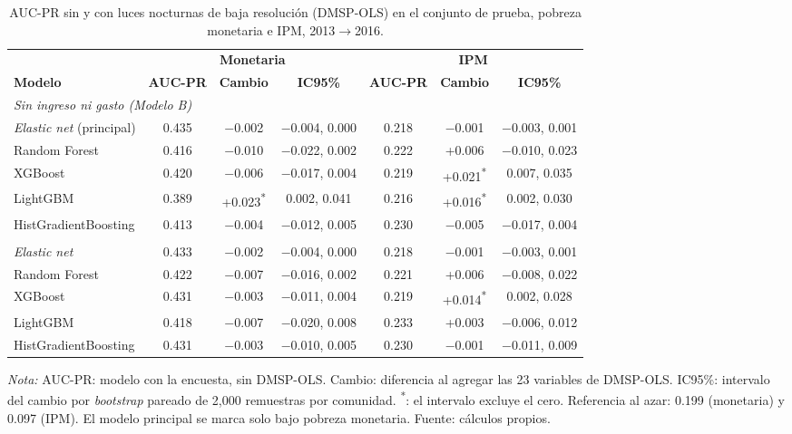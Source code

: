 \begin{table}[tbp]
  \centering
  \caption{AUC-PR sin y con luces nocturnas de baja resolución (DMSP-OLS) en el conjunto de prueba,
  pobreza monetaria e IPM, 2013$\to$2016.}
  \label{tab:aporte_dmsp_pr}
  \footnotesize
  \setlength{\tabcolsep}{4pt}
  \begin{tabular}{l ccc ccc}
    \toprule
    & \multicolumn{3}{c}{\textbf{Monetaria}} & \multicolumn{3}{c}{\textbf{IPM}} \\
    \cmidrule(lr){2-4}\cmidrule(lr){5-7}
    \textbf{Modelo} & \textbf{AUC-PR} & \textbf{Cambio} & \textbf{IC95\%} & \textbf{AUC-PR} & \textbf{Cambio} & \textbf{IC95\%} \\
    \midrule
    \multicolumn{7}{l}{\textit{Sin ingreso ni gasto (Modelo B)}} \\
    \quad \emph{Elastic net} (principal) & 0.435 & $-$0.002 & $-$0.004, 0.000 & 0.218 & $-$0.001 & $-$0.003, 0.001 \\
    \quad Random Forest & 0.416 & $-$0.010 & $-$0.022, 0.002 & 0.222 & +0.006 & $-$0.010, 0.023 \\
    \quad XGBoost & 0.420 & $-$0.006 & $-$0.017, 0.004 & 0.219 & +0.021\textsuperscript{*} & 0.007, 0.035 \\
    \quad LightGBM & 0.389 & +0.023\textsuperscript{*} & 0.002, 0.041 & 0.216 & +0.016\textsuperscript{*} & 0.002, 0.030 \\
    \quad HistGradientBoosting & 0.413 & $-$0.004 & $-$0.012, 0.005 & 0.230 & $-$0.005 & $-$0.017, 0.004 \\
    \addlinespace
    \multicolumn{7}{l}{\textit{Con ingreso y gasto (Modelo A)}} \\
    \quad \emph{Elastic net} & 0.433 & $-$0.002 & $-$0.004, 0.000 & 0.218 & $-$0.001 & $-$0.003, 0.001 \\
    \quad Random Forest & 0.422 & $-$0.007 & $-$0.016, 0.002 & 0.221 & +0.006 & $-$0.008, 0.022 \\
    \quad XGBoost & 0.431 & $-$0.003 & $-$0.011, 0.004 & 0.219 & +0.014\textsuperscript{*} & 0.002, 0.028 \\
    \quad LightGBM & 0.418 & $-$0.007 & $-$0.020, 0.008 & 0.233 & +0.003 & $-$0.006, 0.012 \\
    \quad HistGradientBoosting & 0.431 & $-$0.003 & $-$0.010, 0.005 & 0.230 & $-$0.001 & $-$0.011, 0.009 \\
    \bottomrule
  \end{tabular}
  \begin{minipage}{0.95\textwidth}
    \vspace{4pt}
    \footnotesize \textit{Nota:} AUC-PR: modelo con la encuesta, sin DMSP-OLS.
    Cambio: diferencia al agregar las 23 variables de DMSP-OLS. IC95\%:
    intervalo del cambio por \emph{bootstrap}
    pareado de 2{,}000 remuestras por comunidad. \textsuperscript{*}: el
    intervalo excluye el cero. Referencia al azar: 0.199 (monetaria) y
    0.097 (IPM). El modelo principal se marca solo bajo pobreza
    monetaria.
    Fuente: cálculos propios.
  \end{minipage}
\end{table}
